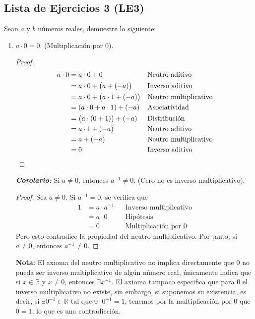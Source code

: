 \documentclass[11pt]{article}
\newcommand{\R}{\mathbb{R}}
\newcommand{\bfit}[1]{\textbf{\textit{#1}}}
\begin{document}
\subsection*{Lista de Ejercicios 3 (LE3)}

Sean $a$ y $b$ números reales, demuestre lo siguiente:

\begin{enumerate}[label=\alph*)]

 \item $a \cdot 0 = 0$. (Multiplicación por $0$).
 \begin{proof} 
  \begin{align*}
   a\cdot0&=a\cdot0+0 && \text{Neutro aditivo}\\
   &=a\cdot0+\bigl(a+\left(-a\right)\bigr) && \text{Inverso aditivo}\\
   &=a\cdot0+\bigl(a\cdot1+\left(-a\right)\bigr) && \text{Neutro multiplicativo}\\
   &=\left(a\cdot0+a\cdot1\right)+\left(-a\right) && \text{Asociatividad}\\
   &=\bigl(a\cdot\left(0+1\right)\bigr)+\left(-a\right) && \text{Distribución}\\
   &=a\cdot1+\left(-a\right) && \text{Neutro aditivo}\\
   &=a+\left(-a\right) && \text{Neutro multiplicativo}\\
   &=0 && \text{Inverso aditivo} \qedhere
  \end{align*} 
 \end{proof}

 \bfit{Corolario:} Si $a\neq 0$, entonces $a^{-1}\neq 0$. (Cero no es inverso multiplicativo).
 \begin{proof} 
  Sea $a\neq 0$. Si $a^{-1}=0$, se verifica que \begin{align*}
   1 &= a\cdot a^{-1} && \text{Inverso multiplicativo}\\
   &= a\cdot 0 && \text{Hipótesis}\\
   &= 0 && \text{Multiplicación por $0$}
  \end{align*} Pero esto contradice la propiedad del neutro multiplicativo. Por tanto, si $a\neq 0$, entonces $a^{-1}\neq 0$.
 \end{proof}

 \textbf{Nota:} El axioma del neutro multiplicativo no implica directamente que $0$ no pueda ser inverso multiplicativo de algún número real, únicamente indica que si $x\in \R$ y $x\neq 0$, entonces $\exists x^{-1}$. El axioma tampoco especifica que para $0$ el inverso multiplicativo no existe, sin embargo, si suponemos su existencia, es decir, si $\exists 0^{-1}\in \R$ tal que $0\cdot 0^{-1}=1$, tenemos por la multiplicación por $0$ que $0=1$, lo que es una contradicción.


\end{enumerate}
\end{document}
